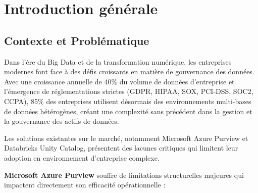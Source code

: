 \chapter*{Introduction générale}


\section*{Contexte et Problématique}

Dans l'ère du Big Data et de la transformation numérique, les entreprises modernes font face à des défis croissants en matière de gouvernance des données. Avec une croissance annuelle de 40\% du volume de données d'entreprise et l'émergence de réglementations strictes (GDPR, HIPAA, SOX, PCI-DSS, SOC2, CCPA), 85\% des entreprises utilisent désormais des environnements multi-bases de données hétérogènes, créant une complexité sans précédent dans la gestion et la gouvernance des actifs de données.

Les solutions existantes sur le marché, notamment Microsoft Azure Purview et Databricks Unity Catalog, présentent des lacunes critiques qui limitent leur adoption en environnement d'entreprise complexe.

\textbf{Microsoft Azure Purview} souffre de limitations structurelles majeures qui impactent directement son efficacité opérationnelle :

